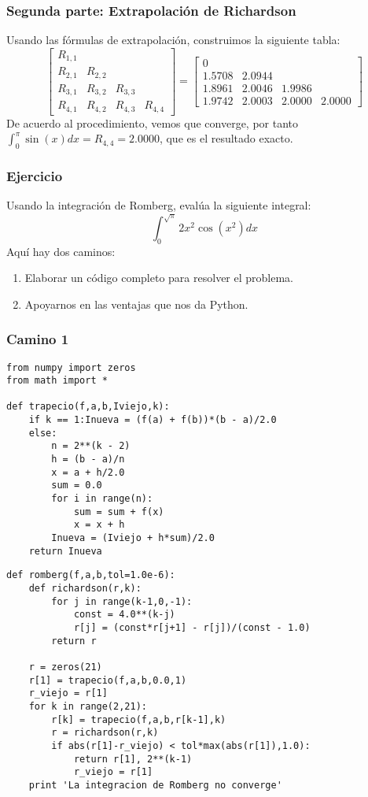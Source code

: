 \begin{frame}
\frametitle{Segunda parte: Extrapolaci\'{o}n de Richardson}
Usando las f\'{o}rmulas de extrapolaci\'{o}n, construimos la siguiente tabla:
\fontsize{12}{12}\selectfont
\[
\begin{bmatrix}
R_{1,1} &         &         & \\
R_{2,1} & R_{2,2} &         & \\
R_{3,1} & R_{3,2} & R_{3,3} & \\
R_{4,1} & R_{4,2} & R_{4,3} & R_{4,4} 
\end{bmatrix}
=
\begin{bmatrix}
0      &        &        & \\
1.5708 & 2.0944 &        & \\
1.8961 & 2.0046 & 1.9986 & \\
1.9742 & 2.0003 & 2.0000 & 2.0000
\end{bmatrix}
\]
\fontsize{14}{14}\selectfont
De acuerdo al procedimiento, vemos que converge, por tanto $\int_{0}^{\pi} \sin(x) dx = R_{4,4}= 2.0000$, que es el resultado exacto.
\end{frame}
\begin{frame}
\frametitle{Ejercicio}
Usando la integraci\'{o}n de Romberg, eval\'{u}a la siguiente integral:
\[ \int_{0}^{\sqrt{\pi}} 2 x^{2} \cos(x^{2}) dx\]
Aqu\'{i} hay dos caminos:
\begin{enumerate}[<+->]
\item Elaborar un c\'{o}digo completo para resolver el problema.
\item Apoyarnos en las ventajas que nos da Python.
\end{enumerate}
\end{frame}
\begin{frame}[fragile]
\frametitle{Camino 1}
\begin{lstlisting}
from numpy import zeros
from math import *

def trapecio(f,a,b,Iviejo,k):
    if k == 1:Inueva = (f(a) + f(b))*(b - a)/2.0
    else:
        n = 2**(k - 2) 
        h = (b - a)/n 
        x = a + h/2.0 
        sum = 0.0
        for i in range(n):
            sum = sum + f(x)
            x = x + h
        Inueva = (Iviejo + h*sum)/2.0
    return Inueva
\end{lstlisting}
\end{frame}
\begin{frame}[fragile]
\begin{lstlisting}
def romberg(f,a,b,tol=1.0e-6):
    def richardson(r,k):
        for j in range(k-1,0,-1):
            const = 4.0**(k-j)
            r[j] = (const*r[j+1] - r[j])/(const - 1.0)
        return r

    r = zeros(21)
    r[1] = trapecio(f,a,b,0.0,1)
    r_viejo = r[1]
    for k in range(2,21):
        r[k] = trapecio(f,a,b,r[k-1],k)
        r = richardson(r,k)
        if abs(r[1]-r_viejo) < tol*max(abs(r[1]),1.0):
            return r[1], 2**(k-1)
            r_viejo = r[1]
    print 'La integracion de Romberg no converge'
\end{lstlisting}
\end{frame}
